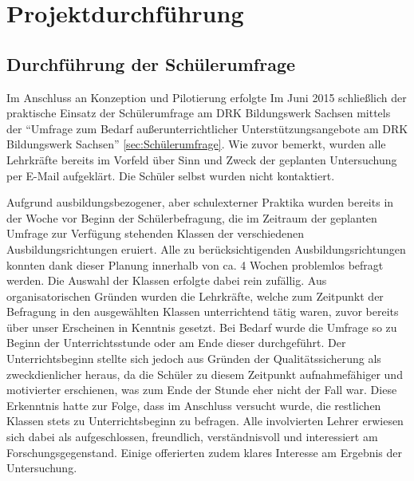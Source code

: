 \section{Projektdurchführung}
\label{sec:Projektdurchführung}

\subsection{Durchführung der Schülerumfrage}
\label{sec:DurchführungDerSchülerumfrage}

Im Anschluss an Konzeption und Pilotierung erfolgte Im Juni 2015 schließlich der praktische Einsatz der Schülerumfrage am DRK Bildungswerk Sachsen mittels der "`Umfrage zum Bedarf außerunterrichtlicher Unterstützungsangebote am DRK Bildungswerk Sachsen"' \ref{sec:Schülerumfrage}. Wie zuvor bemerkt, wurden alle Lehrkräfte bereits im Vorfeld über Sinn und Zweck der geplanten Untersuchung per E-Mail aufgeklärt. Die Schüler selbst wurden nicht kontaktiert. 

Aufgrund ausbildungsbezogener, aber schulexterner Praktika wurden bereits in der Woche vor Beginn der Schülerbefragung, die im Zeitraum der geplanten Umfrage zur Verfügung stehenden Klassen der verschiedenen Ausbildungsrichtungen eruiert. Alle zu berücksichtigenden Ausbildungsrichtungen konnten dank dieser Planung innerhalb von ca. 4 Wochen problemlos befragt werden. Die Auswahl der Klassen erfolgte dabei rein zufällig. Aus organisatorischen Gründen wurden die Lehrkräfte, welche zum Zeitpunkt der Befragung in den ausgewählten Klassen unterrichtend tätig waren, zuvor bereits über unser Erscheinen in Kenntnis gesetzt. Bei Bedarf wurde die Umfrage so zu Beginn der Unterrichtsstunde oder am Ende dieser durchgeführt. Der Unterrichtsbeginn stellte sich jedoch aus Gründen der Qualitätssicherung als zweckdienlicher heraus, da die Schüler zu diesem Zeitpunkt aufnahmefähiger und motivierter erschienen, was zum Ende der Stunde eher nicht der Fall war. Diese Erkenntnis hatte zur Folge, dass im Anschluss versucht wurde, die restlichen Klassen stets zu Unterrichtsbeginn zu befragen. Alle involvierten Lehrer erwiesen sich dabei als aufgeschlossen, freundlich, verständnisvoll und interessiert am Forschungsgegenstand.  Einige offerierten zudem klares Interesse am Ergebnis der Untersuchung. 

